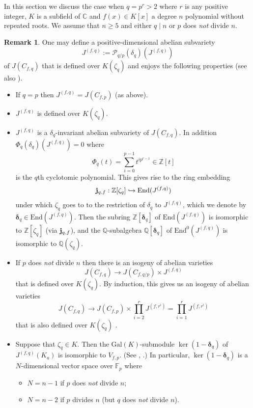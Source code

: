 \documentclass[12pt,a4paper,reqno]{amsart}
\def\Q{{\mathbb Q}}
\def\Z{{\mathbb Z}}
\def\C{{\mathbb C}}
\def\R{{\mathbb R}}
\def\F{{\mathbb F}}
\def\R{{\mathfrak R}}
\def\Gal{\mathrm{Gal}}
\def\End{\mathrm{End}}
\def\delt{{\boldsymbol \delta}}
\theoremstyle{definition}
\newtheorem{rem}[thm]{Remark}
\begin{document}
In this section we discuss the case when $q=p^r>2$ where $r$ is any positive integer, $K$ is a subfield of $\C$ and $f(x) \in K[x]$ a degree $n$ polynomial without repeated roots.
We assume that $n \ge 5$ and either $q\mid n$ or $p$ does {\sl not} divide $n$.

\begin{rem}
\label{factorQ}
One may define a positive-dimensional abelian subvariety 
$$J^{(f,q)}:=\mathcal{P}_{q/p}(\delta_q)(J^{(f,q)})$$
 of $J(C_{f,q})$ \cite[p. 355]{ZarhinM}
that  is defined over $K(\zeta_q)$ and enjoys the following properties \cite{ZarhinM} (see also \cite{ZarhinGanita}).
\begin{itemize}
\item[(i)]
If $q=p$ then  $J^{(f,q)}=J(C_{f,p})$ (as above).
\item[(ii)]
 $J^{(f,q)}$ is defined over $K(\zeta_q)$.
\item[(iii)]
$J^{(f,q)}$ is  a $\delta_q$-invariant abelian subvariety of $J(C_{f,q})$. In addition $\Phi_q(\delta_q)(J^{(f,q)})=0$ where
$$\Phi_q(t)=\sum_{i=0}^{p-1} t^{i p^{r-1}} \in \Z[t]$$
is the $q$th cyclotomic polynomial. This gives rise to the ring embedding
$${\bf j}_{q,f}: \Z[\zeta_q] \hookrightarrow \End(J^{(f,q)})$$
under which $\zeta_q$ goes to to the restriction of $\delta_q$ to $J^{(f,q)}$, which we  denote by $\delt_q \in  \End(J^{(f,q)})$.
Then the subring $\Z[\delt_q]$ of $\End(J^{(f,q)})$ is isomorphic to $\Z[\zeta_q]$ (via ${\bf j}_{q,f}$), and the $\Q$-subalgebra
$\Q[\delt_q]$ of $\End^0(J^{(f,q)})$ is isomorphic to $\Q(\zeta_q)$.
\item[(iv)]
If $p$ does {\sl not} divide $n$ then there is an isogeny of abelian varieties
$$J(C_{f,q}) \to J(C_{f,q/p})\times J^{(f,q)}$$ that is defined over $K(\zeta_q)$.   By induction, this gives us an isogeny of abelian varieties
$$J(C_{f,q}) \to J(C_{f,p}) \times \prod_{i=2}^r J^{(f,r^i)}=\prod_{i=1}^r J^{(f,r^i)}$$
that is also defined over $K(\zeta_q)$ \cite[Cor. 4.12]{ZarhinM}.
\item[(v)]
Suppose that $\zeta_q \in K$. Then the $\Gal(K)$-submodule $\ker(1-\delt_q)$ of $J^{(f,q)}(K_a)$ is isomorphic to $V_{f,p}$. %
(See  \cite[Lemma 4.11]{ZarhinM}, \cite[Th. 9.1]{ZarhinGanita}.) 
In particular, $\ker(1-\delt_q)$  is a $N$-dimensional vector space over $\F_p$ where 
\begin{itemize}
\item
$N=n-1$ if $p$ does {\sl not} divide $n$;
\item
$N=n-2$ if $p$ divides $n$ (but $q$ does {\sl not} divide $n$).

\end{itemize}
\end{itemize}
\end{rem}
\end{document}

